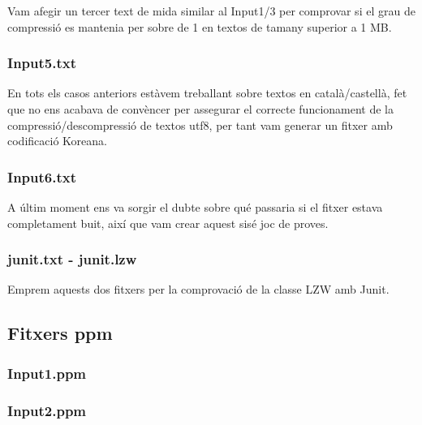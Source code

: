 Vam afegir un tercer text de mida similar al Input1/3 per comprovar si el grau de compressió es mantenia per sobre de 1 en textos de tamany superior a 1 MB.

\subsubsection*{Input5.\+txt}

En tots els casos anteriors estàvem treballant sobre textos en català/castellà, fet que no ens acabava de convèncer per assegurar el correcte funcionament de la compressió/descompressió de textos utf8, per tant vam generar un fitxer amb codificació Koreana.

\subsubsection*{Input6.\+txt}

A últim moment ens va sorgir el dubte sobre qué passaria si el fitxer estava completament buit, així que vam crear aquest sisé joc de proves.

\subsubsection*{junit.\+txt -\/ junit.\+lzw}

Emprem aquests dos fitxers per la comprovació de la classe L\+ZW amb Junit.

\subsection*{Fitxers ppm}

\subsubsection*{Input1.\+ppm}

\subsubsection*{Input2.\+ppm}